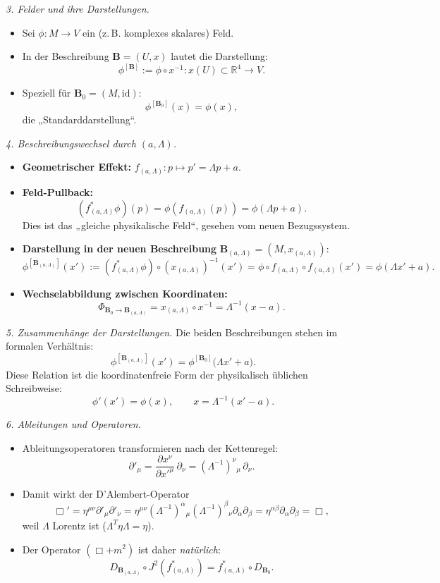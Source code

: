 \documentclass[10pt, letterpaper]{article}
\newcommand{\R}{\mathbb{R}}
\begin{document}
\bigskip
\emph{3. Felder und ihre Darstellungen.}
\begin{itemize}
\item Sei $\phi:M\to V$ ein (z.\,B. komplexes skalares) Feld.
\item In der Beschreibung $\mathbf B=(U,x)$ lautet die Darstellung:
\[
\phi^{[\mathbf B]} := \phi\circ x^{-1}: x(U)\subset\R^4 \to V.
\]
\item Speziell für $\mathbf B_0=(M,\mathrm{id})$:
\[
\phi^{[\mathbf B_0]}(x) = \phi(x),
\]
die „Standarddarstellung“.
\end{itemize}

\bigskip
\emph{4. Beschreibungswechsel durch $(a,\Lambda)$.}
\begin{itemize}
\item \textbf{Geometrischer Effekt:}
$f_{(a,\Lambda)}:p\mapsto p'=\Lambda p + a$.
\item \textbf{Feld-Pullback:}
\[
(f_{(a,\Lambda)}^*\phi)(p) = \phi(f_{(a,\Lambda)}(p))
= \phi(\Lambda p + a).
\]
Dies ist das „gleiche physikalische Feld“, gesehen vom neuen Bezugssystem.
\item \textbf{Darstellung in der neuen Beschreibung} $\mathbf B_{(a,\Lambda)}=(M,x_{(a,\Lambda)})$:
\[
\phi^{[\mathbf B_{(a,\Lambda)}]}(x')
:= (f_{(a,\Lambda)}^*\phi)\circ (x_{(a,\Lambda)})^{-1}(x')
= \phi\circ f_{(a,\Lambda)}\circ f_{(a,\Lambda)}(x')
= \phi(\Lambda x' + a).
\]
\item \textbf{Wechselabbildung zwischen Koordinaten:}
\[
\Phi_{\mathbf B_0\to \mathbf B_{(a,\Lambda)}} = x_{(a,\Lambda)}\circ x^{-1} = \Lambda^{-1}(x - a).
\]
\end{itemize}

\bigskip
\emph{5. Zusammenhänge der Darstellungen.}
Die beiden Beschreibungen stehen im formalen Verhältnis:
\[
\boxed{
\phi^{[\mathbf B_{(a,\Lambda)}]}(x')
= \phi^{[\mathbf B_0]}\big(\Lambda x' + a\big).
}
\]
Diese Relation ist die koordinatenfreie Form der physikalisch üblichen Schreibweise:
\[
\phi'(x') = \phi(x),\qquad x = \Lambda^{-1}(x'-a).
\]

\bigskip
\emph{6. Ableitungen und Operatoren.}
\begin{itemize}
\item Ableitungsoperatoren transformieren nach der Kettenregel:
\[
\partial'_\mu = \frac{\partial x^\nu}{\partial x'^\mu}\,\partial_\nu
= (\Lambda^{-1})^\nu{}_\mu\,\partial_\nu.
\]
\item Damit wirkt der D’Alembert-Operator
\[
\Box' = \eta^{\mu\nu}\partial'_\mu\partial'_\nu
= \eta^{\mu\nu}(\Lambda^{-1})^\alpha{}_\mu(\Lambda^{-1})^\beta{}_\nu \partial_\alpha\partial_\beta
= \eta^{\alpha\beta}\partial_\alpha\partial_\beta = \Box,
\]
weil $\Lambda$ Lorentz ist ($\Lambda^T\eta\Lambda=\eta$).
\item Der Operator $(\Box+m^2)$ ist daher \emph{natürlich}:
\[
D_{\mathbf B_{(a,\Lambda)}}\circ J^2(f_{(a,\Lambda)}^*)
= f_{(a,\Lambda)}^*\circ D_{\mathbf B_0}.
\]
\end{itemize}
\end{document}
